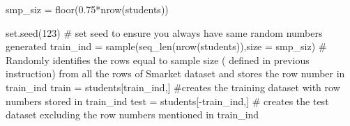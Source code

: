 \documentclass[]{article}
\newenvironment{Shaded}{\begin{snugshade}}{\end{snugshade}}
\newcommand{\CommentTok}[1]{\textcolor[rgb]{0.50,0.62,0.50}{#1}}
\newcommand{\DataTypeTok}[1]{\textcolor[rgb]{0.87,0.87,0.75}{#1}}
\newcommand{\DecValTok}[1]{\textcolor[rgb]{0.86,0.86,0.80}{#1}}
\newcommand{\FloatTok}[1]{\textcolor[rgb]{0.75,0.75,0.82}{#1}}
\newcommand{\KeywordTok}[1]{\textcolor[rgb]{0.94,0.87,0.69}{#1}}
\newcommand{\NormalTok}[1]{\textcolor[rgb]{0.80,0.80,0.80}{#1}}
\newcommand{\OperatorTok}[1]{\textcolor[rgb]{0.94,0.94,0.82}{#1}}
\newcommand{\StringTok}[1]{\textcolor[rgb]{0.80,0.58,0.58}{#1}}
\begin{document}
\begin{Shaded}
\begin{Highlighting}[]
\NormalTok{smp_siz =}\StringTok{ }\KeywordTok{floor}\NormalTok{(}\FloatTok{0.75}\OperatorTok{*}\KeywordTok{nrow}\NormalTok{(students))}

\KeywordTok{set.seed}\NormalTok{(}\DecValTok{123}\NormalTok{)   }\CommentTok{# set seed to ensure you always have same random numbers generated}
\NormalTok{train_ind =}\StringTok{ }\KeywordTok{sample}\NormalTok{(}\KeywordTok{seq_len}\NormalTok{(}\KeywordTok{nrow}\NormalTok{(students)),}\DataTypeTok{size =}\NormalTok{ smp_siz)  }\CommentTok{# Randomly identifies the rows equal to sample size ( defined in previous instruction) from  all the rows of Smarket dataset and stores the row number in train_ind}
\NormalTok{train =}\StringTok{ }\NormalTok{students[train_ind,] }\CommentTok{#creates the training dataset with row numbers stored in train_ind}
\NormalTok{test =}\StringTok{ }\NormalTok{students[}\OperatorTok{-}\NormalTok{train_ind,]  }\CommentTok{# creates the test dataset excluding the row numbers mentioned in train_ind}
\end{Highlighting}
\end{Shaded}
\end{document}
